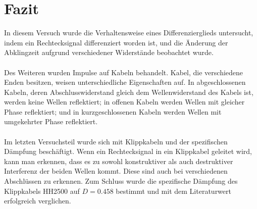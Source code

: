 \documentclass[a4paper,10pt]{article}
\numberwithin{equation}{section}
\begin{document}
\clearpage
\section{Fazit}
In diesem Versuch wurde die Verhaltensweise eines Differenzierglieds untersucht, indem ein Rechtecksignal differenziert worden ist, und die Änderung der Abklingzeit aufgrund verschiedener Widerstände beobachtet wurde.\\\\
Des Weiteren wurden Impulse auf Kabeln behandelt.
Kabel, die verschiedene Enden besitzen, weisen unterschiedliche Eigenschaften auf.
In abgeschlossenen Kabeln, deren Abschlusswiderstand gleich dem Wellenwiderstand des Kabels ist, werden keine Wellen reflektiert;
in offenen Kabeln werden Wellen mit gleicher Phase reflektiert;
und in kurzgeschlossenen Kabeln werden Wellen mit umgekehrter Phase reflektiert.\\\\
Im letzten Versuchsteil wurde sich mit Klippkabeln und der spezifischen Dämpfung beschäftigt.
Wenn ein Rechtecksignal in ein Klippkabel geleitet wird, kann man erkennen, dass es zu sowohl konstruktiver als auch destruktiver Interferenz der beiden Wellen kommt.
Diese sind auch bei verschiedenen Abschlüssen zu erkennen.
Zum Schluss wurde die spezifische Dämpfung des Klippkabels HH2500 auf $D=0.458$ bestimmt und mit dem Literaturwert erfolgreich verglichen. 

\clearpage
\listoffigures
\listoftables



\end{document}

